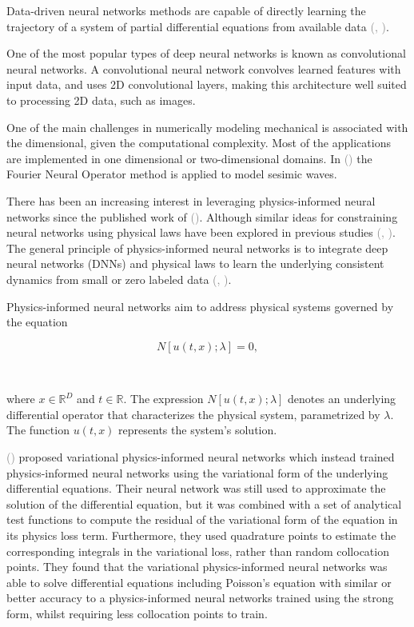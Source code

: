 \documentclass{tufte-handout}
\renewcommand{\citep}[2][]{\textcolor{gray}{(\citeauthor{#2}, \citeyear[#1]{#2})}}
\renewcommand{\citeauthoryear}[2][]{\textcolor{gray}{\citeauthor{#2} (\textcolor{gray}{\citeyear[#1]{#2}})}}
\begin{document}
Data-driven neural networks methods are capable of directly learning the trajectory of a system of partial differential equations from available data \citep{li_neural_2020,li_fourier_2021}.

One of the most popular types of deep neural networks is known as convolutional neural networks. A convolutional neural network convolves learned features with input data, and uses 2D convolutional layers, making this architecture well suited to processing 2D data, such as images.


One of the main challenges in numerically modeling mechanical is associated with the dimensional, given the computational complexity. Most of the applications are implemented in one dimensional or two-dimensional domains. In \citeauthoryear{lehmann_fourier_2023} the Fourier Neural Operator method is applied to model sesimic waves.



There has been an increasing interest in leveraging physics-informed neural networks since the published work of \citeauthoryear{Raissi2019}. Although similar ideas for constraining neural networks using physical laws have been explored in previous studies \citep{lagaris_artificial_1998}. The general principle of physics-informed neural networks is to integrate deep neural networks (DNNs) and physical laws to learn the underlying consistent dynamics from small or zero labeled data \citep{karniadakis_physics-informed_2021}.

Physics-informed neural networks aim to address physical systems governed by the equation

$$
N[u(t, x); \lambda] = 0,
$$

\

where \(x \in \mathbb{R}^D\) and \(t \in \mathbb{R}\). The expression \(N[u(t, x); \lambda]\) denotes an underlying differential operator that characterizes the physical system, parametrized by \(\lambda\). The function \(u(t, x)\) represents the system's solution.


\citeauthoryear{kharazmi_variational_2019} proposed variational physics-informed neural networks which instead trained physics-informed neural networks using the variational form of the underlying differential equations. Their neural network was still used to approximate the solution of the differential equation, but it was combined with a set of analytical test functions to compute the residual of the variational form of the equation in its physics loss term. Furthermore, they used quadrature points to estimate the corresponding integrals in the variational loss, rather than random collocation points. They found that the variational physics-informed neural networks was able to solve differential equations including Poisson’s equation with similar or better accuracy to a physics-informed neural networks trained using the strong form, whilst requiring less collocation points to train.
\end{document}
